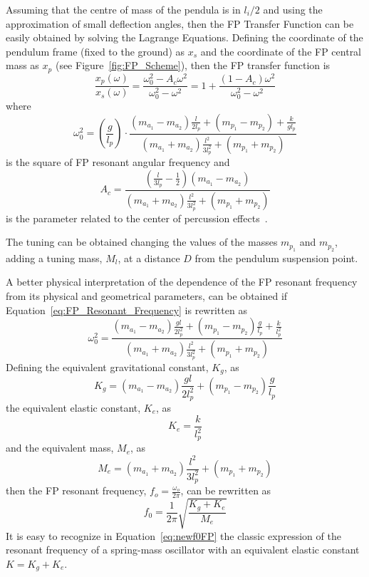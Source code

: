 Assuming that the centre of mass of the pendula is in $l_{i}/2$ and using the approximation of small deflection angles, then the FP Transfer Function can be easily obtained by solving the Lagrange Equations. Defining the coordinate of the pendulum frame (fixed to the ground) as $x_s$ and the coordinate of the FP central mass as $x_p$ (see Figure~\ref{fig:FP_Scheme}), then the FP transfer function is
\begin{equation}
\label{eq:FP_Transfer_Function}
\frac{x_p(\omega)}{x_s(\omega)} = \frac{\omega_0^2 -A_c \omega^2}{\omega_0^2 - \omega^2} = 1 + \frac{(1-A_c)\omega^2}{\omega_0^2 - \omega^2}
\end{equation}
\noindent
where 
\begin{equation}
\label{eq:FP_Resonant_Frequency}
\omega_0^2 =  \left( \frac{g}{l_p} \right) \cdot \frac{(m_{a_1} - m_{a_2})\frac{l}{2 l_p} + (m_{p_1} - m_{p_2})+ \frac{k}{g l_p}} {(m_{a_1} + m_{a_2})\frac{l^2}{3 l_p^2} + (m_{p_1} + m_{p_2})} 
\end{equation}
is the square of FP resonant angular frequency and 
\begin{equation}
\label{eq:Centre_of_Percussion}
A_c = \frac{\left(\frac{l}{3 l_p} - \frac{1}{2} \right) (m_{a_1} - m_{a_2}) }{(m_{a_1} + m_{a_2}) \frac{l^2}{3 l_p^2} + (m_{p_1} + m_{p_2})}
\end{equation}
is the parameter related to the center of percussion effects~\cite{BLAIR-1}. 

The tuning can be obtained changing the values of the masses $m_{p_1}$ and $m_{p_2}$, adding a tuning mass, $M_l$, at a distance $D$ from the pendulum suspension point.

A better physical interpretation of the dependence of the FP resonant frequency from its physical and geometrical parameters, can be obtained if Equation~\ref{eq:FP_Resonant_Frequency} is rewritten as
\begin{equation}
\omega_0^2 = \frac{(m_{a_1}-m_{a_2})\frac{g l}{2l^2_p} + (m_{p_1}-m_{p_2})\frac{g}{l_p} + \frac{k}{l_p^2}}
{(m_{a_1}+m_{a_2})\frac{l^2}{3 l_p^2} + (m_{p_1}+m_{p_2})} 
\end{equation}
\noindent
Defining the equivalent gravitational constant, $K_{g}$, as
\begin{equation}
K_{g} = (m_{a_1}-m_{a_2})\frac{g l}{2 l^2_p} + (m_{p_1}-m_{p_2})\frac{g}{l_p}
\end{equation}
\noindent
the equivalent elastic constant, $K_{e}$, as
\begin{equation}
K_{e} = \frac{k}{l_p^2}
\end{equation}
\noindent
and the equivalent mass, $M_e$, as
\begin{equation}
M_e = (m_{a_1}+m_{a_2})\frac{l^2}{3 l_p^2} + (m_{p_1}+m_{p_2}) 
\end{equation}
\noindent
then the FP resonant frequency, $f_{o} = \frac{\omega_{o}}{2 \pi}$, can be rewritten as
\begin{equation}
\label{eq:newf0FP}
f_0 = \frac{1}{2 \pi} \sqrt{\frac{K_{g}+K_{e}}{M_e}}
\end{equation}
It is easy to recognize in Equation~\ref{eq:newf0FP} the classic expression of the resonant frequency of a spring-mass oscillator with an equivalent elastic constant $ K = K_{g} + K_{e} $.

